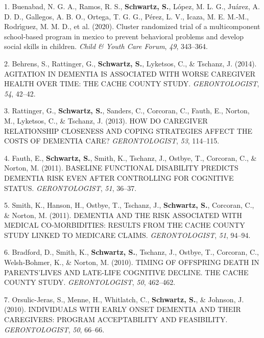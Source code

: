 \documentclass[11pt,a4paper,]{moderncv}
\newlength{\cslhangindent}
\newenvironment{CSLReferences}[2] %
 {\begin{list}{}{%
  \setlength{\itemindent}{0pt}
  \setlength{\leftmargin}{0pt}
  \setlength{\parsep}{0pt}
  \ifodd #1
   \setlength{\leftmargin}{\cslhangindent}
   \setlength{\itemindent}{-1\cslhangindent}
  \fi
  \setlength{\itemsep}{#2\baselineskip}}}
 {\end{list}}
\begin{document}
\label{refs-01a8a0846c3dac8afbc2440de9ea2c05}
\begin{CSLReferences}{1}{0}
1. Buenabad, N. G. A., Ramos, R. S., \textbf{Schwartz, S.}, López, M. L.
G., Juárez, A. D. D., Gallegos, A. B. O., Ortega, T. G. G., Pérez, L.
V., Icaza, M. E. M.-M., Rodrı́guez, M. M. D., et al. (2020). Cluster
randomized trial of a multicomponent school-based program in mexico to
prevent behavioral problems and develop social skills in children.
\emph{Child \& Youth Care Forum}, \emph{49}, 343--364.

2. Behrens, S., Rattinger, G., \textbf{Schwartz, S.}, Lyketsos, C., \&
Tschanz, J. (2014). AGITATION IN DEMENTIA IS ASSOCIATED WITH WORSE
CAREGIVER HEALTH OVER TIME: THE CACHE COUNTY STUDY.
\emph{GERONTOLOGIST}, \emph{54}, 42--42.

3. Rattinger, G., \textbf{Schwartz, S.}, Sanders, C., Corcoran, C.,
Fauth, E., Norton, M., Lyketsos, C., \& Tschanz, J. (2013). HOW DO
CAREGIVER RELATIONSHIP CLOSENESS AND COPING STRATEGIES AFFECT THE COSTS
OF DEMENTIA CARE? \emph{GERONTOLOGIST}, \emph{53}, 114--115.

4. Fauth, E., \textbf{Schwartz, S.}, Smith, K., Tschanz, J., Ostbye, T.,
Corcoran, C., \& Norton, M. (2011). BASELINE FUNCTIONAL DISABILITY
PREDICTS DEMENTIA RISK EVEN AFTER CONTROLLING FOR COGNITIVE STATUS.
\emph{GERONTOLOGIST}, \emph{51}, 36--37.

5. Smith, K., Hanson, H., Ostbye, T., Tschanz, J.,
\textbf{Schwartz, S.}, Corcoran, C., \& Norton, M. (2011). DEMENTIA AND
THE RISK ASSOCIATED WITH MEDICAL CO-MORBIDITIES: RESULTS FROM THE CACHE
COUNTY STUDY LINKED TO MEDICARE CLAIMS. \emph{GERONTOLOGIST}, \emph{51},
94--94.

6. Bradford, D., Smith, K., \textbf{Schwartz, S.}, Tschanz, J., Ostbye,
T., Corcoran, C., Welsh-Bohmer, K., \& Norton, M. (2010). TIMING OF
OFFSPRING DEATH IN PARENTS'LIVES AND LATE-LIFE COGNITIVE DECLINE. THE
CACHE COUNTY STUDY. \emph{GERONTOLOGIST}, \emph{50}, 462--462.

7. Orsulic-Jeras, S., Menne, H., Whitlatch, C., \textbf{Schwartz, S.},
\& Johnson, J. (2010). INDIVIDUALS WITH EARLY ONSET DEMENTIA AND THEIR
CAREGIVERS: PROGRAM ACCEPTABILITY AND FEASIBILITY. \emph{GERONTOLOGIST},
\emph{50}, 66--66.

\end{CSLReferences}
\end{document}
